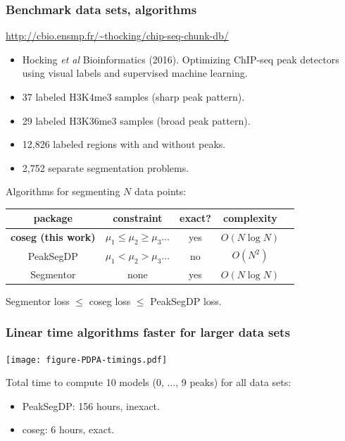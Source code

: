 \documentclass{beamer}
\begin{document}
\begin{frame}
  \frametitle{Benchmark data sets, algorithms}

 \url{http://cbio.ensmp.fr/~thocking/chip-seq-chunk-db/}
  \begin{itemize}
  \item Hocking \emph{et al} Bioinformatics (2016). Optimizing
    ChIP-seq peak detectors using visual labels and supervised machine
    learning.
  \item 37 labeled H3K4me3 samples (sharp peak pattern).
  \item 29 labeled H3K36me3 samples (broad peak pattern).
  \item 12,826 labeled regions with and without peaks.
  \item 2,752 separate segmentation problems.
  \end{itemize}

  Algorithms for segmenting $N$ data points:
  \begin{center}
  \begin{tabular}{ccccc}
    package & constraint & exact? & complexity \\
    \hline
    \textbf{coseg (this work)} & $\mu_1 \leq \mu_2 \geq \mu_3 \dots$ & yes & $O(N\log N)$ \\
    PeakSegDP & $\mu_1 < \mu_2 > \mu_3 \dots$ & no & $O(N^2)$\\
    Segmentor & none & yes & $O(N\log N)$
  \end{tabular}

  \vskip 0.5cm

  Segmentor loss $\leq$ coseg loss $\leq$ PeakSegDP loss.
  \end{center}
\end{frame}

\begin{frame}
  \frametitle{Linear time algorithms faster for larger data sets}
  \texttt{[image: figure-PDPA-timings.pdf]}

  Total time to compute 10 models (0, ..., 9 peaks) for all data sets:
  \begin{itemize}
  \item PeakSegDP: 156 hours, inexact.
  \item coseg: 6 hours, exact.
  \end{itemize}
\end{frame}
\end{document}
